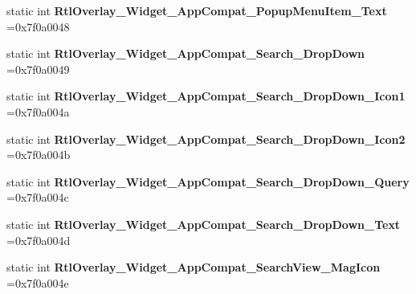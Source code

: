 \begin{DoxyCompactItemize}
\item 
\mbox{\label{classandroid_1_1support_1_1v7_1_1mediarouter_1_1R_1_1style_aef565af8760c34035c3ce4ad28665e4d}} 
static int {\bfseries Rtl\+Overlay\+\_\+\+Widget\+\_\+\+App\+Compat\+\_\+\+Popup\+Menu\+Item\+\_\+\+Text} =0x7f0a0048
\item 
\mbox{\label{classandroid_1_1support_1_1v7_1_1mediarouter_1_1R_1_1style_a30113f052951133ace78ddeb4a6bfaa9}} 
static int {\bfseries Rtl\+Overlay\+\_\+\+Widget\+\_\+\+App\+Compat\+\_\+\+Search\+\_\+\+Drop\+Down} =0x7f0a0049
\item 
\mbox{\label{classandroid_1_1support_1_1v7_1_1mediarouter_1_1R_1_1style_a220ee1fb098545732fab862a158a0efa}} 
static int {\bfseries Rtl\+Overlay\+\_\+\+Widget\+\_\+\+App\+Compat\+\_\+\+Search\+\_\+\+Drop\+Down\+\_\+\+Icon1} =0x7f0a004a
\item 
\mbox{\label{classandroid_1_1support_1_1v7_1_1mediarouter_1_1R_1_1style_a49af21dde71efdd041f6c21117963e39}} 
static int {\bfseries Rtl\+Overlay\+\_\+\+Widget\+\_\+\+App\+Compat\+\_\+\+Search\+\_\+\+Drop\+Down\+\_\+\+Icon2} =0x7f0a004b
\item 
\mbox{\label{classandroid_1_1support_1_1v7_1_1mediarouter_1_1R_1_1style_aae5d998bfb85335f8b76e0b1f73422bb}} 
static int {\bfseries Rtl\+Overlay\+\_\+\+Widget\+\_\+\+App\+Compat\+\_\+\+Search\+\_\+\+Drop\+Down\+\_\+\+Query} =0x7f0a004c
\item 
\mbox{\label{classandroid_1_1support_1_1v7_1_1mediarouter_1_1R_1_1style_af7cb90e4a2ed9e04fb1990e0b0864908}} 
static int {\bfseries Rtl\+Overlay\+\_\+\+Widget\+\_\+\+App\+Compat\+\_\+\+Search\+\_\+\+Drop\+Down\+\_\+\+Text} =0x7f0a004d
\item 
\mbox{\label{classandroid_1_1support_1_1v7_1_1mediarouter_1_1R_1_1style_ac71f479e65938e54113e4a4f29f44135}} 
static int {\bfseries Rtl\+Overlay\+\_\+\+Widget\+\_\+\+App\+Compat\+\_\+\+Search\+View\+\_\+\+Mag\+Icon} =0x7f0a004e

\end{DoxyCompactItemize}
